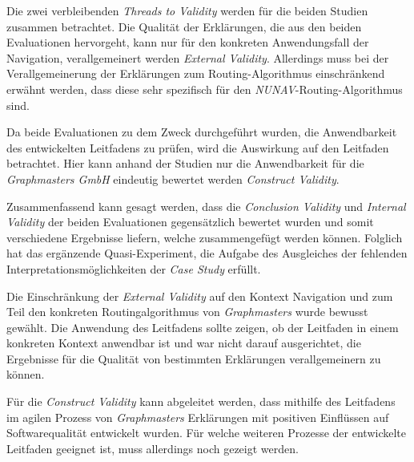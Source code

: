 \smallskip

Die zwei verbleibenden \textit{Threads to Validity} werden für die beiden Studien zusammen betrachtet. Die Qualität der Erklärungen, die aus den beiden Evaluationen hervorgeht, kann nur für den konkreten Anwendungsfall der Navigation, verallgemeinert werden \textit{External Validity}. Allerdings muss bei der Verallgemeinerung der Erklärungen zum Routing-Algorithmus einschränkend erwähnt werden, dass diese sehr spezifisch für den \textit{NUNAV}-Routing-Algorithmus sind.

Da beide Evaluationen zu dem Zweck durchgeführt wurden, die Anwendbarkeit des entwickelten Leitfadens zu prüfen, wird die Auswirkung auf den Leitfaden betrachtet. Hier kann anhand der Studien nur die Anwendbarkeit für die \textit{Graphmasters GmbH} eindeutig bewertet werden \textit{Construct Validity}. 

\smallskip

Zusammenfassend kann gesagt werden, dass die \textit{Conclusion Validity} und \textit{Internal Validity} der beiden Evaluationen gegensätzlich bewertet wurden und somit verschiedene Ergebnisse liefern, welche zusammengefügt werden können. Folglich hat das ergänzende Quasi-Experiment, die Aufgabe des Ausgleiches der fehlenden Interpretationsmöglichkeiten der \textit{Case Study} erfüllt.

Die Einschränkung der \textit{External Validity} auf den Kontext Navigation und zum Teil den konkreten Routingalgorithmus von \textit{Graphmasters} wurde bewusst gewählt. Die Anwendung des Leitfadens sollte zeigen, ob der Leitfaden in einem konkreten Kontext anwendbar ist und war nicht darauf ausgerichtet, die Ergebnisse für die Qualität von bestimmten Erklärungen verallgemeinern zu können.

Für die \textit{Construct Validity} kann abgeleitet werden, dass mithilfe des Leitfadens im agilen Prozess von \textit{Graphmasters} Erklärungen mit positiven Einflüssen auf Softwarequalität entwickelt wurden. Für welche weiteren Prozesse der entwickelte Leitfaden geeignet ist, muss allerdings noch gezeigt werden.